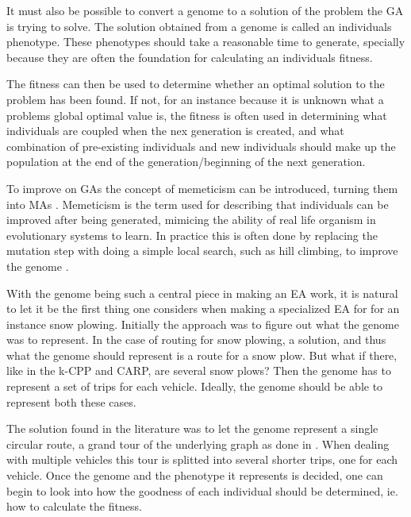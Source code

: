 It must also be possible to convert a genome to a solution of the problem the GA is trying to solve. The solution obtained from a genome is called an individuals phenotype. These phenotypes should take a reasonable time to generate, specially because they are often the foundation for calculating an individuals fitness.

The fitness can then be used to determine whether an optimal solution to the problem has been found. If not, for an instance because it is unknown what a problems global optimal value is, the fitness is often used in determining what individuals are coupled when the nex generation is created, and what combination of pre-existing individuals and new individuals should make up the population at the end of the generation/beginning of the next generation.

To improve on GAs the concept of memeticism can be introduced, turning them into MAs \citep{moscato1989memeticism}. Memeticism is the term used for describing that individuals can be improved after being generated, mimicing the ability of real life organism in evolutionary systems to learn. In practice this is often done by replacing the mutation step with doing a simple local search, such as hill climbing, to improve the genome \citep{lacomme2004competitiveMA}.

With the genome being such a central piece in making an EA work, it is natural to let it be the first thing one considers when making a specialized EA for for an instance snow plowing. Initially the approach was to figure out what the genome was to represent. In the case of routing for snow plowing, a solution, and thus what the genome should represent is a route for a snow plow. But what if there, like in the k-CPP and CARP, are several snow plows? Then the genome has to represent a set of trips for each vehicle. Ideally, the genome should be able to represent both these cases.

The solution found in the literature was to let the genome represent a single circular route, a grand tour of the underlying graph as done in \citet{lacomme2004competitiveMA}. When dealing with multiple vehicles this tour is splitted into several shorter trips, one for each vehicle. Once the genome and the phenotype it represents is decided, one can begin to look into how the goodness of each individual should be determined, ie. how to calculate the fitness.



